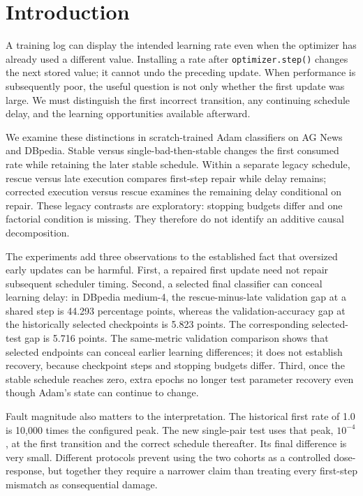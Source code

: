 \documentclass[referee,pdflatex,sn-mathphys-num]{sn-jnl}
\begin{document}
\section{Introduction}\label{introduction}

A training log can display the intended learning rate even when the optimizer has already used a different value. Installing a rate after \texttt{optimizer.step()} changes the next stored value; it cannot undo the preceding update. When performance is subsequently poor, the useful question is not only whether the first update was large. We must distinguish the first incorrect transition, any continuing schedule delay, and the learning opportunities available afterward.

We examine these distinctions in scratch-trained Adam classifiers on AG News and DBpedia. Stable versus single-bad-then-stable changes the first consumed rate while retaining the later stable schedule. Within a separate legacy schedule, rescue versus late execution compares first-step repair while delay remains; corrected execution versus rescue examines the remaining delay conditional on repair. These legacy contrasts are exploratory: stopping budgets differ and one factorial condition is missing. They therefore do not identify an additive causal decomposition.

The experiments add three observations to the established fact that oversized early updates can be harmful. First, a repaired first update need not repair subsequent scheduler timing. Second, a selected final classifier can conceal learning delay: in DBpedia medium-4, the rescue-minus-late validation gap at a shared step is 44.293 percentage points, whereas the validation-accuracy gap at the historically selected checkpoints is 5.823 points. The corresponding selected-test gap is 5.716 points. The same-metric validation comparison shows that selected endpoints can conceal earlier learning differences; it does not establish recovery, because checkpoint steps and stopping budgets differ. Third, once the stable schedule reaches zero, extra epochs no longer test parameter recovery even though Adam's state can continue to change.

Fault magnitude also matters to the interpretation. The historical first rate of 1.0 is 10,000 times the configured peak. The new single-pair test uses that peak, \(10^{-4}\), at the first transition and the correct schedule thereafter. Its final difference is very small. Different protocols prevent using the two cohorts as a controlled dose-response, but together they require a narrower claim than treating every first-step mismatch as consequential damage.
\end{document}
